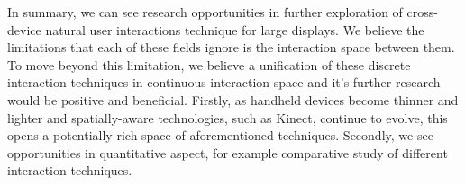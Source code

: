 In summary, we can see research opportunities in further exploration of cross-device natural user interactions technique for large displays. We believe the limitations that each of these fields ignore is the interaction space between them. To move beyond this limitation, we believe a unification of these discrete interaction techniques in continuous interaction space and it's further research would be positive and beneficial.
Firstly, as handheld devices become thinner and lighter and spatially-aware technologies, such as Kinect, continue to evolve, this opens a potentially rich space of aforementioned techniques. 
Secondly, we see opportunities in quantitative aspect, for example comparative study of different interaction techniques. 
